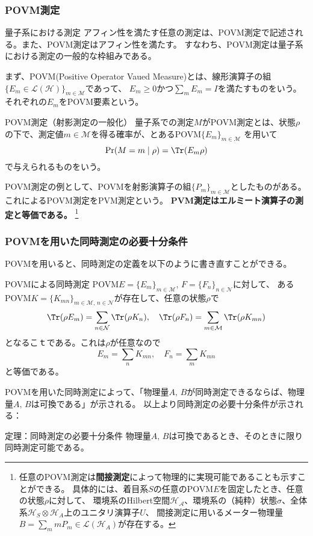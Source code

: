 \documentclass[10pt,aspectratio=169,xcolor=dvipsnames,table,dvipdfmx]{beamer}
\begin{document}
\begin{frame}
  \frametitle{POVM測定}
  \begin{alertblock}{量子系における測定}
    アフィン性を満たす任意の測定は、POVM測定で記述される。また、POVM測定はアフィン性を満たす。
    すなわち、POVM測定は量子系における測定の一般的な枠組みである。
  \end{alertblock}
  まず、POVM(Positive Operator Vaued Measure)とは、線形演算子の組$\{E_m\in \mathcal{L}(\mathcal{H})\}_{m\in \mathcal{M}}$であって、
  $E_m\geq 0$かつ$\sum_m E_m = I$を満たすものをいう。それぞれの$E_m$をPOVM要素という。
  
  \begin{block}{POVM測定（射影測定の一般化）}
    量子系での測定$M$がPOVM測定とは、状態$\rho$の下で、測定値$m\in \mathcal{M}$を得る確率が、とあるPOVM$\{E_m\}_{m\in\mathcal{M}}$
    を用いて
    \begin{equation}
      \Pr(M=m\mid \rho) = \Tr(E_m\rho)
    \end{equation}
    で与えられるものをいう。
  \end{block}
POVM測定の例として、POVMを射影演算子の組$\{P_m\}_{m\in \mathcal{M}}$としたものがある。これによるPOVM測定をPVM測定という。
\textbf{PVM測定はエルミート演算子の測定と等価である。}
\footnote{任意のPOVM測定は\textbf{間接測定}によって物理的に実現可能であることも示すことができる。
具体的には、着目系$S$の任意のPOVM$E$を固定したとき、任意の状態$\rho$に対して、
環境系のHilbert空間$\mathcal{H_A}$、環境系の（純粋）状態$\sigma$、全体系$\mathcal{H}_S\otimes \mathcal{H}_A$上のユニタリ演算子$U$、
間接測定に用いるメーター物理量$B=\sum_{m}mP_m\in \mathcal{L}(\mathcal{H}_A)$が存在する。}
\end{frame}

\begin{frame}
  \frametitle{POVMを用いた同時測定の必要十分条件}
  POVMを用いると、同時測定の定義を以下のように書き直すことができる。
  \begin{block}{POVMによる同時測定}
    POVM$E=\{E_m\}_{m\in\mathcal{M}},\,F=\{F_n\}_{n\in\mathcal{N}}$に対して、
    あるPOVM$K=\{K_{mn}\}_{m\in\mathcal{M},\,n\in\mathcal{N}}$が存在して、任意の状態$\rho$で
    \begin{equation}
      \Tr(\rho E_m) = \sum_{n\in\mathcal{N}}\Tr(\rho K_{n}),\quad \Tr(\rho F_n) = \sum_{m\in\mathcal{M}}\Tr(\rho K_{mn})
    \end{equation}
    となるこｔである。これは$\rho$が任意なので
    \begin{equation}
      E_m = \sum_{n}K_{mn},\quad F_n = \sum_{m}K_{mn}
    \end{equation}
    と等価である。
  \end{block}
  POVMを用いた同時測定によって、「物理量$A,\,B$が同時測定できるならば、物理量$A,\,B$は可換である」が示される。
  以上より同時測定の必要十分条件が示される：
  \begin{block}{定理：同時測定の必要十分条件}
    物理量$A,\,B$は可換であるとき、そのときに限り同時測定可能である。
  \end{block}
\end{frame}
\end{document}
